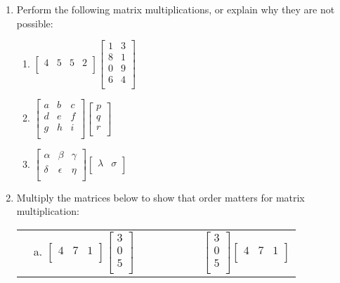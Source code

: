 \documentclass[11pt]{article}
\begin{document}
\begin{enumerate}
\item Perform the following matrix multiplications, or explain why they are not possible:
\begin{enumerate}
\item $\left[\begin{array}{cccc}
4 & 5 & 5 & 2 \\
\end{array}\right]
\left[\begin{array}{cc}
1 & 3 \\
8 & 1 \\
0 & 9 \\
6 & 4 \\
\end{array}\right]$
\item $\left[\begin{array}{ccc}
a & b & c \\
d & e & f \\
g & h & i \\
\end{array}\right]
\left[\begin{array}{c}
p \\
q \\
r \\
\end{array}\right]$
\item $\left[\begin{array}{ccc}
\alpha & \beta    & \gamma \\
\delta & \epsilon & \eta \\
\end{array}\right]
\left[\begin{array}{cc}
\lambda & \sigma \\
\end{array}\right]$
\end{enumerate}




\item Multiply the matrices below to show that order matters for matrix multiplication: 

\begin{tabular}{cccc}
&
a. $\left[\begin{array}{ccc}
4 & 7 & 1 \\
\end{array}\right]
\left[\begin{array}{c}
3 \\
0 \\
5 \\
\end{array}\right]$
&
~~~~~~~~
&
$\left[\begin{array}{c}
3 \\
0 \\
5 \\
\end{array}\right]
\left[\begin{array}{ccc}
4 & 7 & 1 \\
\end{array}\right]$
\end{tabular}



\end{enumerate}
\end{document}
